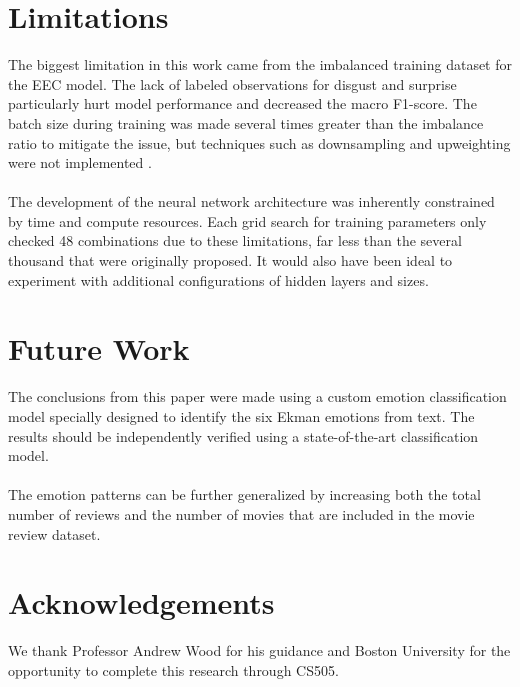 \documentclass[11pt]{article}
\begin{document}
\section{Limitations}
The biggest limitation in this work came from the imbalanced training dataset for the EEC model. The lack of labeled observations for disgust and surprise particularly hurt model performance and decreased the macro F1-score. The batch size during training was made several times greater than the imbalance ratio to mitigate the issue, but techniques such as downsampling and upweighting were not implemented \cite{Imbalanced}. \\ \\
The development of the neural network architecture was inherently constrained by time and compute resources. Each grid search for training parameters only checked 48 combinations due to these limitations, far less than the several thousand that were originally proposed. It would also have been ideal to experiment with additional configurations of hidden layers and sizes.
\section{Future Work}
The conclusions from this paper were made using a custom emotion classification model specially designed to identify the six Ekman emotions from text. The results should be independently verified using a state-of-the-art classification model. \\ \\
The emotion patterns can be further generalized by increasing both the total number of reviews and the number of movies that are included in the movie review dataset.
\section{Acknowledgements}
We thank Professor Andrew Wood for his guidance and Boston University for the opportunity to complete this research through CS505.

\end{document}

